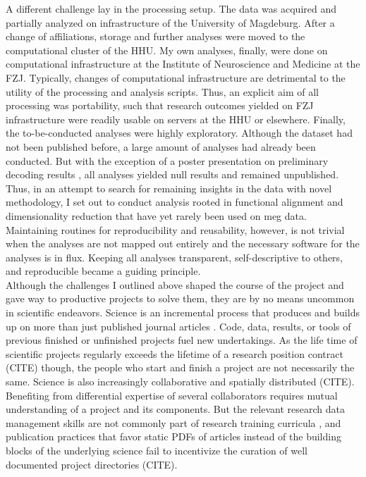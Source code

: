 A different challenge lay in the processing setup.
The data was acquired and partially analyzed on infrastructure of the University of Magdeburg.
After a change of affiliations, storage and further analyses were moved to the computational cluster of the \gls{HHU}.
My own analyses, finally, were done on computational infrastructure at the Institute of Neuroscience and Medicine at the \gls{FZJ}.
Typically, changes of computational infrastructure are detrimental to the utility of the processing and analysis scripts.
Thus, an explicit aim of all processing was portability, such that research outcomes yielded on \gls{FZJ} infrastructure were readily usable on servers at the \gls{HHU} or elsewhere.
Finally, the to-be-conducted analyses were highly exploratory.
Although the dataset had not been published before, a large amount of analyses had already been conducted.
But with the exception of a poster presentation on preliminary decoding results \citep{kaiserposter}, all analyses yielded null results and remained unpublished.
Thus, in an attempt to search for remaining insights in the data with novel methodology, I set out to conduct analysis rooted in functional alignment and dimensionality reduction that have yet rarely been used on \gls{meg} data.
Maintaining routines for reproducibility and reusability, however, is not trivial when the analyses are not mapped out entirely and the necessary software for the analyses is in flux.
Keeping all analyses transparent, self-descriptive to others, and reproducible became a guiding principle.\\
Although the challenges I outlined above shaped the course of the project and gave way to productive projects to solve them, they are by no means uncommon in scientific endeavors.
Science is an incremental process that produces and builds up on more than just published journal articles \citep{mons2018data}.
Code, data, results, or tools of previous finished or unfinished projects fuel new undertakings.
As the life time of scientific projects regularly exceeds the lifetime of a research position contract (CITE) though, the people who start and finish a project are not necessarily the same.
Science is also increasingly collaborative and spatially distributed (CITE).
Benefiting from differential expertise of several collaborators requires mutual understanding of a project and its components.
But the relevant research data management skills are not commonly part of research training curricula \citep{grisham2016proposed}, and publication practices that favor static PDFs of articles instead of the building blocks of the underlying science fail to incentivize the curation of well documented project directories (CITE).
